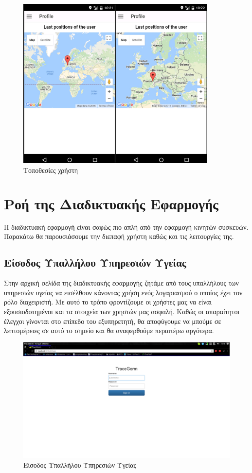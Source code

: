 \begin{figure}[h]
  \centering
  \includegraphics[width=100mm]{images/profile.jpg}
  \caption{Τοποθεσίες χρήστη}
  \label{fig:locations}
\end{figure}

\section{Ροή της Διαδικτυακής Εφαρμογής}
Η διαδικτυακή εφαρμογή είναι σαφώς πιο απλή από την εφαρμογή κινητών συσκευών. Παρακάτω θα παρουσιάσουμε την διεπαφή χρήστη καθώς και τις λειτουργίες της.

\subsection{Είσοδος Υπαλλήλου Υπηρεσιών Υγείας}
Στην αρχική σελίδα της διαδικτυακής εφαρμογής ζητάμε από τους υπαλλήλους των υπηρεσιών υγείας να εισέλθουν κάνοντας χρήση ενός λογαριασμού ο οποίος έχει τον ρόλο διαχειριστή. Με αυτό το τρόπο φροντίζουμε οι χρήστες μας να είναι εξουσιοδοτημένοι και τα στοιχεία των χρηστών μας ασφαλή. Καθώς οι απαραίτητοι έλεγχοι γίνονται στο επίπεδο του εξυπηρετητή, θα αποφύγουμε να μπούμε σε λεπτομέρειες σε αυτό το σημείο και θα αναφερθούμε περαιτέρω αργότερα.

\begin{figure}[h]
  \centering
  \includegraphics[width=150mm]{images/login.png}
  \caption{Είσοδος Υπαλλήλου Υπηρεσιών Υγείας}
  \label{fig:login-webapp}
\end{figure}

